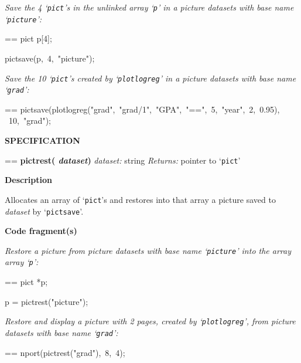 \documentclass{book}
\makeatletter
\newcommand\Texinfocommandstyletextvar[1]{{\normalfont{}\textsl{#1}}}%
\newenvironment{Texinfopreformatted}{%
  \par\GNUTobeylines\obeyspaces\frenchspacing\parskip=\z@\parindent=\z@}{}
{\catcode`\^^M=13 \gdef\GNUTobeylines{\catcode`\^^M=13 \def^^M{\null\par}}}
\newenvironment{Texinfoindented}{\begin{list}{}{}\item\relax}{\end{list}}
\renewcommand{\_}{\Texinfounderscore\discretionary{}{}{}}
\makeatother
\begin{document}
\emph{Save the 4 `\texttt{pict}'s in the unlinked array `\texttt{p}' in a picture
datasets with base name `\texttt{picture}':}
\begin{Texinfoindented}
\begin{Texinfopreformatted}%
\ttfamily pict p[4];

pict\_save(p,\ 4,\ "picture");
\end{Texinfopreformatted}
\end{Texinfoindented}

\emph{Save the 10 `\texttt{pict}'s created by `\texttt{plotlogreg}' in a picture
datasets with base name `\texttt{grad}':}
\begin{Texinfoindented}
\begin{Texinfopreformatted}%
\ttfamily pict\_save(plotlogreg("grad",\ "grad/1",\ "GPA",\ "==",\ 5,\ "year",\ 2,\ 0.95),
\          10,\ "grad");
\end{Texinfopreformatted}
\end{Texinfoindented}

\noindent{}\textbf{SPECIFICATION}
\begin{Texinfoindented}
\begin{Texinfopreformatted}%
\textbf{pict\_rest( \Texinfocommandstyletextvar{dataset})}
\Texinfocommandstyletextvar{dataset:} string
\Texinfocommandstyletextvar{Returns:} pointer to `\texttt{pict}'
\end{Texinfopreformatted}
\end{Texinfoindented}

\noindent{}\textbf{Description}

Allocates an array of `\texttt{pict}'s and
restores into that array a picture saved
to \Texinfocommandstyletextvar{dataset} by `\texttt{pict\_save}'.

\noindent{}\textbf{Code fragment(s)}

\emph{Restore a picture from picture datasets with base
name `\texttt{picture}' into the array array `\texttt{p}':}
\begin{Texinfoindented}
\begin{Texinfopreformatted}%
\ttfamily pict *p;

p = pict\_rest("picture");
\end{Texinfopreformatted}
\end{Texinfoindented}

\emph{Restore and display a picture with 2 pages, created
by `\texttt{plotlogreg}', from picture datasets
with base name `\texttt{grad}':}
\begin{Texinfoindented}
\begin{Texinfopreformatted}%
\ttfamily nport(pict\_rest("grad"),\ 8,\ 4);
\end{Texinfopreformatted}
\end{Texinfoindented}
\end{document}
